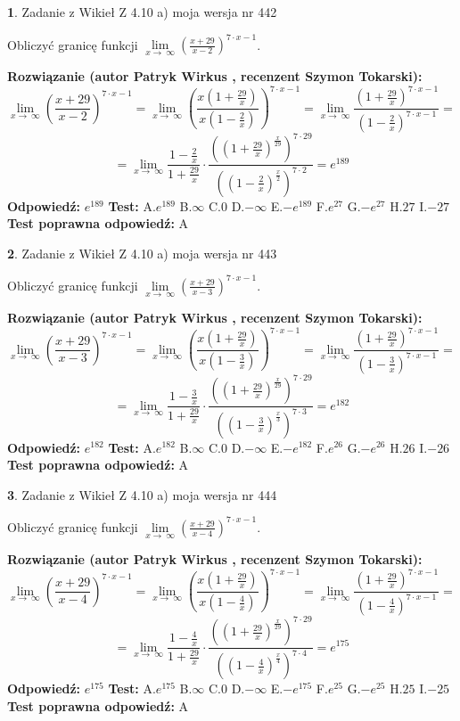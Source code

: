 \documentclass[12pt, a4paper]{article}
\theoremstyle{definition} %
\newtheorem{zad}{}
\newcommand{\zadStart}[1]{\begin{zad}#1\newline}
\newcommand{\zadStop}{\end{zad}}
\newcommand{\rozwStart}[2]{\noindent \textbf{Rozwiązanie (autor #1 , recenzent #2): }\newline}
\newcommand{\rozwStop}{\newline}
\newcommand{\odpStart}{\noindent \textbf{Odpowiedź:}\newline}
\newcommand{\odpStop}{\newline}
\newcommand{\testStart}{\noindent \textbf{Test:}\newline}
\newcommand{\testStop}{\newline}
\newcommand{\kluczStart}{\noindent \textbf{Test poprawna odpowiedź:}\newline}
\newcommand{\kluczStop}{\newline}
\begin{document}
\zadStart{Zadanie z Wikieł Z 4.10 a) moja wersja nr 442}

Obliczyć granicę funkcji  $\lim\limits_{x\to\ \infty}(\frac{x+29}{x-2})^{7\cdot x-1}$.
\zadStop
\rozwStart{Patryk Wirkus}{Szymon Tokarski}
$$\lim\limits_{x\to\ \infty}(\frac{x+29}{x-2})^{7\cdot x-1} = \lim\limits_{x\to\ \infty}(\frac{x(1+\frac{29}{x})}{x(1-\frac{2}{x})})^{7\cdot x-1}=\lim\limits_{x\to\ \infty}\frac{(1+\frac{29}{x})^{7\cdot x-1}}{(1-\frac{2}{x})^{7\cdot x-1}}=$$
$$=\lim\limits_{x\to\ \infty}\frac{1-\frac{2}{x}}{1+\frac{29}{x}}\cdot\frac{((1+\frac{29}{x})^{\frac{x}{29}})^{7\cdot29}}{((1-\frac{2}{x})^{\frac{x}{2}})^{7\cdot2}}=e^{189}$$
\rozwStop
\odpStart
$e^{189}$
\odpStop
\testStart
A.$e^{189}$ B.$\infty$ C.$0$ D.$-\infty$ E.$-e^{189}$
F.$e^{27}$ G.$-e^{27}$
H.$27$
I.$-27$
\testStop
\kluczStart
A
\kluczStop



\zadStart{Zadanie z Wikieł Z 4.10 a) moja wersja nr 443}

Obliczyć granicę funkcji  $\lim\limits_{x\to\ \infty}(\frac{x+29}{x-3})^{7\cdot x-1}$.
\zadStop
\rozwStart{Patryk Wirkus}{Szymon Tokarski}
$$\lim\limits_{x\to\ \infty}(\frac{x+29}{x-3})^{7\cdot x-1} = \lim\limits_{x\to\ \infty}(\frac{x(1+\frac{29}{x})}{x(1-\frac{3}{x})})^{7\cdot x-1}=\lim\limits_{x\to\ \infty}\frac{(1+\frac{29}{x})^{7\cdot x-1}}{(1-\frac{3}{x})^{7\cdot x-1}}=$$
$$=\lim\limits_{x\to\ \infty}\frac{1-\frac{3}{x}}{1+\frac{29}{x}}\cdot\frac{((1+\frac{29}{x})^{\frac{x}{29}})^{7\cdot29}}{((1-\frac{3}{x})^{\frac{x}{3}})^{7\cdot3}}=e^{182}$$
\rozwStop
\odpStart
$e^{182}$
\odpStop
\testStart
A.$e^{182}$ B.$\infty$ C.$0$ D.$-\infty$ E.$-e^{182}$
F.$e^{26}$ G.$-e^{26}$
H.$26$
I.$-26$
\testStop
\kluczStart
A
\kluczStop



\zadStart{Zadanie z Wikieł Z 4.10 a) moja wersja nr 444}

Obliczyć granicę funkcji  $\lim\limits_{x\to\ \infty}(\frac{x+29}{x-4})^{7\cdot x-1}$.
\zadStop
\rozwStart{Patryk Wirkus}{Szymon Tokarski}
$$\lim\limits_{x\to\ \infty}(\frac{x+29}{x-4})^{7\cdot x-1} = \lim\limits_{x\to\ \infty}(\frac{x(1+\frac{29}{x})}{x(1-\frac{4}{x})})^{7\cdot x-1}=\lim\limits_{x\to\ \infty}\frac{(1+\frac{29}{x})^{7\cdot x-1}}{(1-\frac{4}{x})^{7\cdot x-1}}=$$
$$=\lim\limits_{x\to\ \infty}\frac{1-\frac{4}{x}}{1+\frac{29}{x}}\cdot\frac{((1+\frac{29}{x})^{\frac{x}{29}})^{7\cdot29}}{((1-\frac{4}{x})^{\frac{x}{4}})^{7\cdot4}}=e^{175}$$
\rozwStop
\odpStart
$e^{175}$
\odpStop
\testStart
A.$e^{175}$ B.$\infty$ C.$0$ D.$-\infty$ E.$-e^{175}$
F.$e^{25}$ G.$-e^{25}$
H.$25$
I.$-25$
\testStop
\kluczStart
A
\kluczStop
\end{document}
